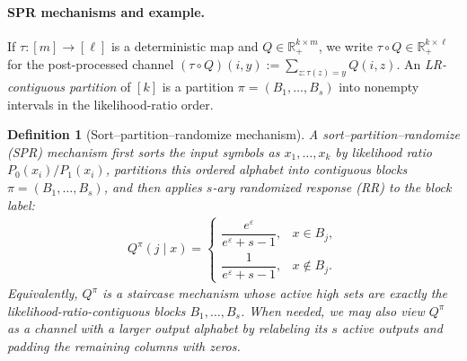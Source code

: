 \documentclass{article}
\theoremstyle{plain}
\newtheorem{definition}[theorem]{Definition}
\theoremstyle{definition}
\theoremstyle{plain}
\newcommand{\eps}{\varepsilon}
\begin{document}
\paragraph{SPR mechanisms and example.}
If $\tau:[m]\to[\ell]$ is a deterministic map and $Q\in\mathbb R_+^{k\times m}$, we write $\tau\circ Q\in\mathbb R_+^{k\times \ell}$ for the post-processed channel $(\tau\circ Q)(i,y):=\sum_{z:\tau(z)=y} Q(i,z)$. An \emph{LR-contiguous partition} of $[k]$ is a partition $\pi=(B_1,\dots,B_s)$ into nonempty intervals in the likelihood-ratio order.

\begin{definition}[Sort--partition--randomize mechanism]
    \label{def:spr}
    A \emph{sort--partition--randomize} (SPR) mechanism first sorts the input symbols as $x_1,\dots,x_k$ by likelihood ratio $P_0(x_i)/P_1(x_i)$, partitions this ordered alphabet into contiguous blocks $\pi=(B_1,\dots,B_s)$, and then applies $s$-ary randomized response (RR) to the block label:
    \begin{align}
        Q^\pi(j \mid x)=
        \begin{cases}
            \dfrac{e^\eps}{e^\eps+s-1}, & x\in B_j,\\[5pt]
            \dfrac{1}{e^\eps+s-1}, & x\notin B_j .
        \end{cases}
    \end{align}
    Equivalently, $Q^\pi$ is a staircase mechanism whose active high sets are exactly the likelihood-ratio-contiguous blocks $B_1,\dots,B_s$. When needed, we may also view $Q^\pi$ as a channel with a larger output alphabet by relabeling its $s$ active outputs and padding the remaining columns with zeros.
\end{definition}
\end{document}
